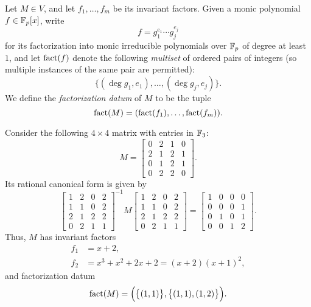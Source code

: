 \begin{defn}
Let $M\in V$, and let $f_1,\ldots,f_m$ be its invariant factors. Given a monic polynomial $f\in\mathbb{F}_p[x]$, write
\begin{equation*}
f=g_1^{e_1}\cdots g_j^{e_j}
\end{equation*}
for its factorization into monic irreducible polynomials over $\mathbb{F}_p$ of degree at least $1$, and let $\operatorname{fact}(f)$ denote the following \emph{multiset} of ordered pairs of integers (so multiple instances of the same pair are permitted):
\begin{equation*}
\big\{(\deg g_1,e_1),\ldots,(\deg g_j,e_j)\big\}.
\end{equation*}
We define the \emph{factorization datum} of $M$ to be the tuple
\begin{equation*}
\operatorname{fact}(M)=(\operatorname{fact}(f_1),\ldots,\operatorname{fact}(f_m)).
\end{equation*}
\end{defn}
\begin{example}
\label{ex:fact}
Consider the following $4\times 4$ matrix with entries in $\mathbb{F}_3$:
\begin{equation*}
M=\begin{bmatrix}
0&2&1&0\\
2&1&2&1\\
0&1&2&1\\
0&2&2&0
\end{bmatrix}.
\end{equation*}
Its rational canonical form is given by
\begin{equation*}
\begin{bmatrix}
1&2&0&2\\
1&1&0&2\\
2&1&2&2\\
0&2&1&1
\end{bmatrix}^{-1}
M
\begin{bmatrix}
1&2&0&2\\
1&1&0&2\\
2&1&2&2\\
0&2&1&1
\end{bmatrix}
=
\begin{bmatrix}
1&0&0&0\\
0&0&0&1\\
0&1&0&1\\
0&0&1&2
\end{bmatrix}.
\end{equation*}
Thus, $M$ has invariant factors
\begin{align*}
f_1&=x+2,\\
f_2&=x^3+x^2+2x+2=(x+2)(x+1)^2,
\end{align*}
and factorization datum
\begin{equation}
\label{eqn:factM}
\operatorname{fact}(M)=\Big(\big\{(1,1)\big\},\big\{(1,1),(1,2)\big\}\Big).
\end{equation}
\end{example}
